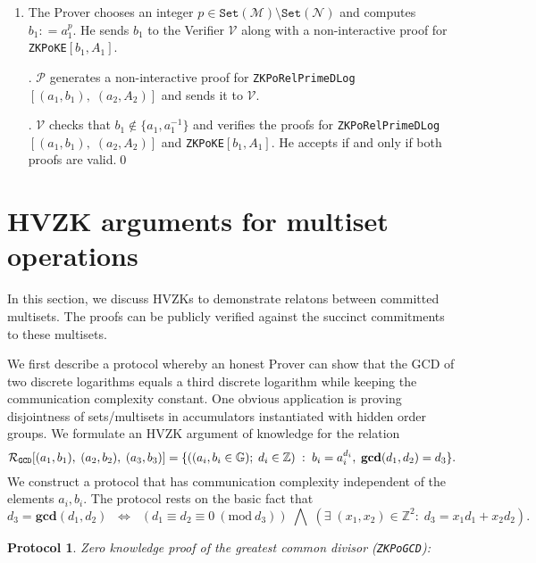 \documentclass[11pt, lettersize, notitlepage, leqno, footskip=0.6cm]{article}
\newcommand{\bz}{\mathbb Z}
\newcommand{\ttt}{\texttt}
\newcommand{\sett}{\ttt{Set}}
\newcommand{\LRA}{\Longleftrightarrow}
\newcommand{\mc}{\mathcal}
\newcommand{\mb}{\mathbb}
\newcommand{\mbf}{\mathbf}
\newcommand{\mP}{\mc{P}}
\newcommand{\V}{\mc{V}}
\newcommand{\vs}{\vspace{-0.15cm}}
\newcommand{\noin}{\noindent}
\newcommand{\Mod}[1]{\ (\mathrm{mod}\ #1)}
\newcommand{\GCD}{\mbf{gcd}}
\newtheorem{Prot}[Thm]{Protocol}
\numberwithin{equation}{section}
\begin{document}
\begin{enumerate}[wide, labelwidth=!, labelindent=0pt] \vs \item The Prover chooses an integer $p\in \sett(\mc{M})\setminus \sett(\mc{N})$ and computes $b_1: = a_1^p$. He sends $b_1$ to the Verifier $\V$ along with a non-interactive proof for \verb|ZKPoKE|$[b_1, A_1]$.

\noin 2. $\mP$ generates a non-interactive proof for \verb|ZKPoRelPrimeDLog|$[(a_1, b_1),\; (a_2, A_2)]$ and sends it to $\V$.

\noin 3. $\V$ checks that $b_1\notin \{ a_1, a_1^{-1}\}$ and verifies the proofs for \verb|ZKPoRelPrimeDLog|$[(a_1, b_1),\; (a_2, A_2)]$ and \verb|ZKPoKE|$[b_1, A_1]$. He accepts if and only if both proofs are valid.\qed \end{enumerate}









\section{\fontsize{12}{12}\selectfont HVZK arguments for multiset operations}

In this section, we discuss HVZKs to demonstrate relatons between committed multisets. The proofs can be publicly verified against the succinct commitments to these multisets. 

We first describe a protocol whereby an honest Prover can show that the GCD of two discrete logarithms equals a third discrete logarithm while keeping the communication complexity constant. One obvious application is proving disjointness of sets/multisets in accumulators instantiated with hidden order groups. We formulate an HVZK argument of knowledge for the relation \vs  $$\mc{R}_{{\ttt{GCD}}}[(a_1,b_1),\;(a_2,b_2),\;(a_3,b_3)] = \{((a_i, b_i\in\mb{G});\;d_i\in\bz)\;:\; b_i = a_i^{d_i},\;\GCD(d_1,d_2)=d_3  \} . \vs $$ We construct a protocol that has communication complexity independent of the elements $a_i, b_i$. The protocol rests on the basic fact that \vs $$d_3 = \GCD(d_1, d_2)\;\; \LRA \;\;(d_1\equiv d_2\equiv 0 \Mod{d_3})\;\bigwedge \; \left(\exists \; (x_1,x_2)\in \bz^2:\; d_3 = x_1d_1+x_2d_2  \right).$$
 

\begin{Prot} \normalfont \hypertarget{GCD}{\textit{Zero knowledge proof of the greatest common divisor}} (\verb|ZKPoGCD|):\end{Prot} \vspace{-0.3cm}
\end{document}

